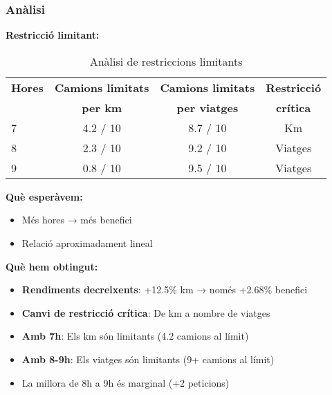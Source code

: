 \subsubsection{Anàlisi}

\textbf{Restricció limitant:}

\begin{table}[H]
\centering
\begin{tabular}{@{}lccc@{}}
\toprule
\textbf{Hores} & \textbf{Camions limitats} & \textbf{Camions limitats} & \textbf{Restricció} \\
 & \textbf{per km} & \textbf{per viatges} & \textbf{crítica} \\
\midrule
7 & 4.2 / 10 & 8.7 / 10 & Km \\
8 & 2.3 / 10 & 9.2 / 10 & Viatges \\
9 & 0.8 / 10 & 9.5 / 10 & Viatges \\
\bottomrule
\end{tabular}
\caption{Anàlisi de restriccions limitants}
\label{tab:exp7-restriccions}
\end{table}

\textbf{Què esperàvem:}
\begin{itemize}
    \item Més hores → més benefici
    \item Relació aproximadament lineal
\end{itemize}

\textbf{Què hem obtingut:}
\begin{itemize}
    \item \textbf{Rendiments decreixents}: +12.5\% km → només +2.68\% benefici
    \item \textbf{Canvi de restricció crítica}: De km a nombre de viatges
    \item \textbf{Amb 7h}: Els km són limitants (4.2 camions al límit)
    \item \textbf{Amb 8-9h}: Els viatges són limitants (9+ camions al límit)
    \item La millora de 8h a 9h és marginal (+2 peticions)
\end{itemize}